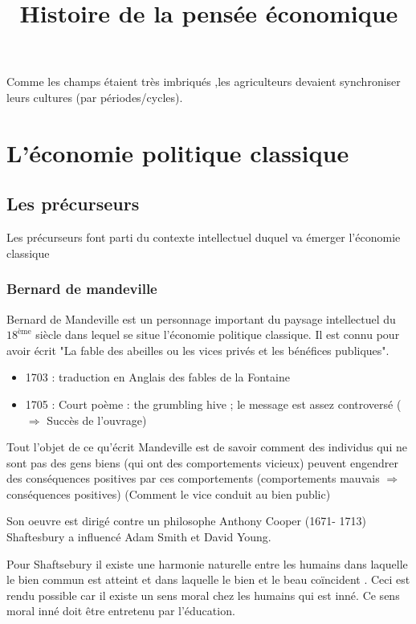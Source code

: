 \documentclass{article}
\title{Histoire de la pensée économique}
\begin{document}
\maketitle
\tableofcontents
\newpage
Comme les champs étaient très imbriqués ,les agriculteurs devaient synchroniser leurs cultures (par périodes/cycles).

\section{L'économie politique classique}

\subsection{Les précurseurs}
Les précurseurs font parti du contexte intellectuel duquel va émerger l'économie classique

\subsubsection{Bernard de mandeville}
Bernard de Mandeville est un personnage important du paysage intellectuel du \(18^{\textrm{ème}}\) siècle dans lequel se situe l'économie politique classique. Il est connu pour avoir écrit "La fable des abeilles ou les vices privés et les bénéfices publiques".

\begin{itemize}
	\item 1703 : traduction en Anglais des fables de la Fontaine
	\item 1705 : Court poème  : the grumbling hive ; le message est assez controversé  (\(\Rightarrow\) Succès de l'ouvrage)
\end{itemize}

Tout l'objet de ce qu'écrit Mandeville est de savoir comment des individus qui ne sont pas des gens biens (qui ont des comportements vicieux) peuvent engendrer des conséquences positives par ces comportements (comportements mauvais \(\Rightarrow\) conséquences positives) (Comment le vice conduit au bien public)

Son oeuvre est dirigé contre un philosophe Anthony Cooper (1671- 1713) Shaftesbury a influencé Adam Smith et David Young.

Pour Shaftsebury il existe une harmonie naturelle entre les humains dans laquelle le bien commun est atteint et dans laquelle le bien et le beau coïncident . Ceci est rendu possible car il existe un sens moral chez les humains qui est inné. Ce sens moral inné doit être entretenu par l'éducation.
\end{document}
